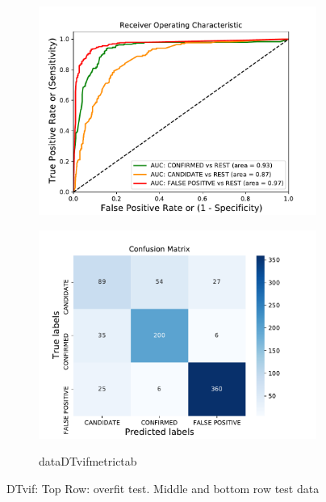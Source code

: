 \begin{figure}[H]
\begin{subfigure}{.49\textwidth}
                \includegraphics[width = 1\textwidth]{data/DT_vif_roc.pdf}
                \end{subfigure}
                \begin{subfigure}{.49\textwidth}
                \includegraphics[width = 1\textwidth]{data/DT_vif_cm.pdf}
                \end{subfigure}
                \begin{subfigure}{1\textwidth}
                \csname dataDTvifmetrictab\endcsname
                \end{subfigure}
                \caption{DTvif: Top Row: overfit test. Middle and bottom row test data}
                \label{fig:data/DT_vif_roc}
                \end{figure}